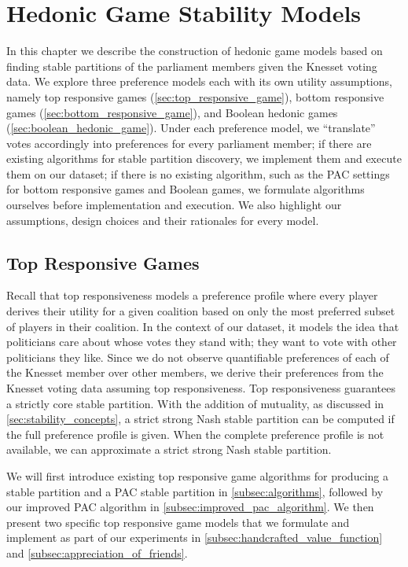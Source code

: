 
\chapter{Hedonic Game Stability Models}
\label{ch:hedonic}

In this chapter we describe the construction of hedonic game models based on
finding stable partitions of the parliament members given the Knesset voting
data.
We explore three preference models each with its own utility assumptions,
namely top responsive games (\autoref{sec:top_responsive_game}), bottom
responsive games (\autoref{sec:bottom_responsive_game}), and Boolean hedonic
games (\autoref{sec:boolean_hedonic_game}).
Under each preference model, we ``translate'' votes accordingly into preferences
for every parliament member; if there are existing algorithms for stable
partition discovery, we implement them and execute them on our dataset;
if there is no existing algorithm, such as the PAC settings for bottom
responsive games and Boolean games, we formulate algorithms ourselves before
implementation and execution.
We also highlight our assumptions, design choices and their rationales for every
model.

\section{Top Responsive Games}
\label{sec:top_responsive_game}
Recall that top responsiveness models a preference profile where every player
derives their utility for a given coalition based on only the most preferred
subset of players in their coalition.
In the context of our dataset, it models the idea that politicians care about
whose votes they stand with; they want to vote with other politicians they like.
Since we do not observe quantifiable preferences of each of the Knesset member
over other members, we derive their preferences from the Knesset voting data
assuming top responsiveness.
Top responsiveness guarantees a strictly core stable partition.
With the addition of mutuality, as discussed in \autoref{sec:stability_concepts},
a strict strong Nash stable partition can be computed if the full preference
profile is given.
When the complete preference profile is not available, we can approximate
a strict strong Nash stable partition.

We will first introduce existing top responsive game algorithms for producing a
stable partition and a PAC stable partition in \autoref{subsec:algorithms},
followed by our improved PAC algorithm in
\autoref{subsec:improved_pac_algorithm}.
We then present two specific top responsive game models that we formulate and
implement as part of our experiments in
\autoref{subsec:handcrafted_value_function} and
\autoref{subsec:appreciation_of_friends}.

